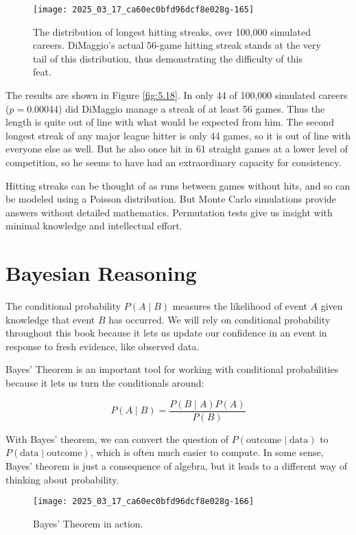 \documentclass[10pt]{article}
\begin{document}
\begin{figure}[H]
    \centering
    \texttt{[image: 2025\_03\_17\_ca60ec0bfd96dcf8e028g-165]}
    \caption{The distribution of longest hitting streaks, over 100,000 simulated careers. DiMaggio's actual 56-game hitting streak stands at the very tail of this distribution, thus demonstrating the difficulty of this feat.}
\end{figure}

The results are shown in Figure \ref{fig:5.18}. In only 44 of 100,000 simulated careers ($p=0.00044$) did DiMaggio manage a streak of at least 56 games. Thus the length is quite out of line with what would be expected from him. The second longest streak of any major league hitter is only 44 games, so it is out of line with everyone else as well. But he also once hit in 61 straight games at a lower level of competition, so he seems to have had an extraordinary capacity for consistency.

Hitting streaks can be thought of as runs between games without hits, and so can be modeled using a Poisson distribution. But Monte Carlo simulations provide answers without detailed mathematics. Permutation tests give us insight with minimal knowledge and intellectual effort.

\section{Bayesian Reasoning}
The conditional probability $P(A \mid B)$ measures the likelihood of event $A$ given knowledge that event $B$ has occurred. We will rely on conditional probability throughout this book because it lets us update our confidence in an event in response to fresh evidence, like observed data.

Bayes' Theorem is an important tool for working with conditional probabilities because it lets us turn the conditionals around:

\begin{equation}
P(A \mid B)=\frac{P(B \mid A) P(A)}{P(B)}
\end{equation}

With Bayes' theorem, we can convert the question of $P(\text{outcome} \mid \text{data})$ to $P(\text{data} \mid \text{outcome})$, which is often much easier to compute. In some sense, Bayes' theorem is just a consequence of algebra, but it leads to a different way of thinking about probability.

\begin{figure}[H]
    \centering
    \texttt{[image: 2025\_03\_17\_ca60ec0bfd96dcf8e028g-166]}
    \caption{Bayes' Theorem in action.}
\end{figure}
\end{document}
